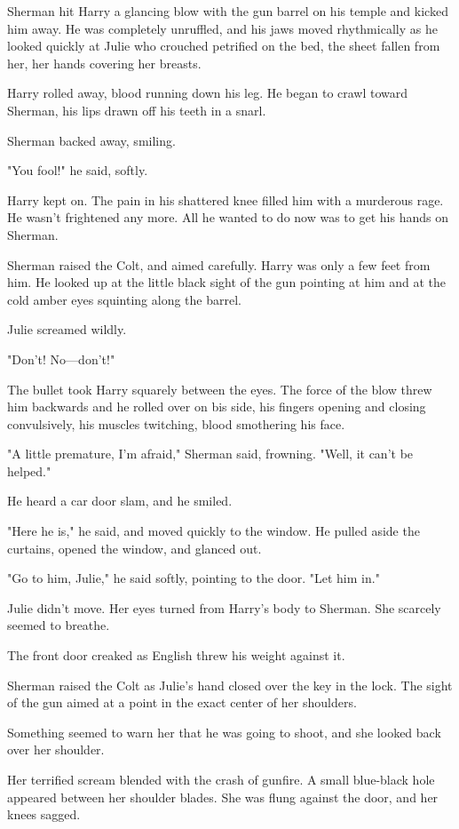 \documentclass{novel}
\begin{document}
Sherman hit Harry a glancing blow with the gun barrel on his temple and kicked him away. He was completely unruffled, and his jaws moved rhythmically as he looked quickly at Julie who crouched petrified on the bed, the sheet fallen from her, her hands covering her breasts.

Harry rolled away, blood running down his leg. He began to crawl toward Sherman, his lips drawn off his teeth in a snarl.

Sherman backed away, smiling.

"You fool!" he said, softly.

Harry kept on. The pain in his shattered knee filled him with a murderous rage. He wasn't frightened any more. All he wanted to do now was to get his hands on Sherman.

Sherman raised the Colt, and aimed carefully. Harry was only a few feet from him. He looked up at the little black sight of the gun pointing at him and at the cold amber eyes squinting along the barrel.

Julie screamed wildly.

"Don't! No—don't!"

The bullet took Harry squarely between the eyes. The force of the blow threw him backwards and he rolled over on bis side, his fingers opening and closing convulsively, his muscles twitching, blood smothering his face.

"A little premature, I'm afraid," Sherman said, frowning. "Well, it can't be helped."

He heard a car door slam, and he smiled.

"Here he is," he said, and moved quickly to the window. He pulled aside the curtains, opened the window, and glanced out.

"Go to him, Julie," he said softly, pointing to the door. "Let him in."

Julie didn't move. Her eyes turned from Harry's body to Sherman. She scarcely seemed to breathe.

The front door creaked as English threw his weight against it.

Sherman raised the Colt as Julie's hand closed over the key in the lock. The sight of the gun aimed at a point in the exact center of her shoulders.

Something seemed to warn her that he was going to shoot, and she looked back over her shoulder.

Her terrified scream blended with the crash of gunfire. A small blue-black hole appeared between her shoulder blades. She was flung against the door, and her knees sagged.
\end{document}
